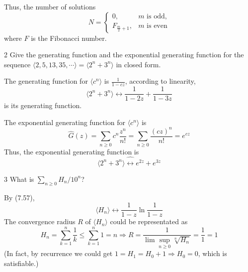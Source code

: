 \documentclass[a4paper,12pt]{article}
\makeatletter
\newtheorem*{solution}{Solution}
\theoremstyle{definition}
\renewenvironment{solution}[1][Solution] {\par\pushQED{\qed}\normalfont\topsep6\p@\@plus6\p@\relax\trivlist\item[\hskip\labelsep\bfseries#1\@addpunct{.}]\ignorespaces}{\popQED\endtrivlist\@endpefalse} \makeatother
\newenvironment{problems}{\begin{list}{}{\renewcommand{\makelabel}[1]{\textbf{##1}\hfil}}}{\end{list}}
\makeatother
\begin{document}
\begin{problems}
\begin{solution}
\begin{equation*}
        \end{equation*}
        Thus, the number of solutions
        \begin{equation*}
            N = \begin{cases}
                0, &m\text{ is odd,}\\
                F_{\frac{m}{2}+1}, &m\text{ is even}
            \end{cases}
        \end{equation*}
        where $F$ is the Fibonacci number.
    \end{solution}
   \item[2]  Give the generating function and the exponential generating function for the sequence $\langle 2, 5, 13, 35, \cdots \rangle =\langle 2^n+3^n\rangle$ in closed form.
    \begin{solution}
        The generating function for $\langle c^n \rangle $ is $\frac{1}{1-cz}$, according to linearity,
        \begin{equation*}
            \langle 2^n+3^n\rangle \leftrightarrow \frac{1}{1-2z} + \frac{1}{1-3z}
        \end{equation*}
        is its generating function.
        
        The exponential generating function for $\langle c^n \rangle$ is
        \begin{equation*}
            \hat{G}(z) = \sum_{n\geq 0} c^n \frac{z^n}{n!} = \sum_{n\geq 0} \frac{(cz)^n}{n!} = e^{cz}
        \end{equation*}
        Thus, the exponential generating function is
        \begin{equation*}
            \langle 2^n+3^n\rangle \hat{\leftrightarrow} e^{2z} + e^{3z}
        \end{equation*}
    \end{solution}
   \item[3]  What is $\sum_{n\geq 0} H_n/10^n$?
   \begin{solution}
       By (7.57),
       \begin{equation*}
           \langle H_n \rangle \leftrightarrow \frac{1}{1-z}\ln\frac{1}{1-z}
       \end{equation*}
       The convergence radius $R$ of $\langle H_n \rangle $ could be representated as
       \begin{equation*}
           H_n = \sum_{k = 1}^n \frac{1}{k} \leq \sum_{k=1}^n 1 = n \Rightarrow R = \frac{1}{\lim\sup_{n\geq 0} \sqrt[n]{H_n}} = \frac{1}{1} = 1
       \end{equation*}
       (In fact, by recurrence we could get $1 = H_1 = H_0 + 1 \Rightarrow H_0 = 0$, which is satisfiable.)


\end{solution}
\end{problems}
\end{document}
